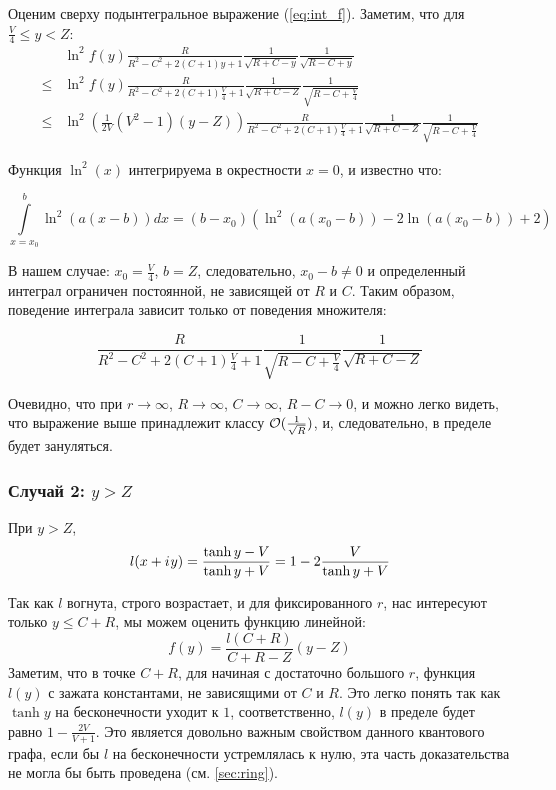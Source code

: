 Оценим сверху подынтегральное выражение (\ref{eq:int_f}). Заметим, что для $\frac{V}{4} \le y < Z$:
\begin{align*}
    & \ln^2 f(y) \frac{R}{R^2 - C^2 + 2 (C + 1) y + 1} \frac{1}{\sqrt{R + C - y}} \frac{1}{\sqrt{R - C + y}} 
\\ \le & \ln^2 f(y) \frac{R}{R^2 - C^2 + 2 (C + 1) \frac{V}{4} + 1} \frac{1}{\sqrt{R + C - Z}} \frac{1}{\sqrt{R - C + \frac{V}{4}}}
\\ \le & \ln^2 \left( \frac{1}{2 V}(V^2 - 1) (y - Z) \right) \frac{R}{R^2 - C^2 + 2 (C + 1) \frac{V}{4} + 1} \frac{1}{\sqrt{R + C - Z}} \frac{1}{\sqrt{R - C + \frac{V}{4}}}
\end{align*}

Функция $\ln^2(x)$ интегрируема в окрестности $x = 0$, и известно что: %

\[
\int\limits_{x=x_0}^b \ln^2(a (x - b)) dx = (b - x_0) (\ln^2(a (x_0 - b)) - 2 \ln(a (x_0 - b)) + 2)
\]

В нашем случае: $x_0 = \frac{V}{4}$, $b = Z$, следовательно, $x_0 - b \ne 0$ и определенный интеграл ограничен постоянной, не зависящей от $R$ и $C$. Таким образом, поведение интеграла зависит только от поведения множителя:

\[
\frac{R}{R^2 - C^2 + 2 (C + 1) \frac{V}{4} + 1} \frac{1}{\sqrt{R - C + \frac{V}{4}}} \frac{1}{\sqrt{R + C - Z}}
\]

Очевидно, что при $r \to \infty$, $R \to \infty$, $C \to \infty$, $R - C \to 0$, и можно легко видеть, что выражение выше принадлежит классу $\mathcal{O}(\frac{1}{\sqrt{R}})$, и, следовательно, в пределе будет зануляться.

\subsubsection{Случай 2: $y > Z$}
При $y > Z$, 
\[
l(x + {i\mkern1mu} y) 
 = \frac{\tanh y - V}{\tanh y + V}
 = 1 - 2 \frac{V}{\tanh y + V}
\]

Так как $l$ вогнута, строго возрастает, и для фиксированного $r$, нас интересуют только $y \le C + R$, мы можем оценить функцию линейной: 
\[
f(y) = \frac{l(C + R)}{C + R - Z} (y - Z)
\]
Заметим, что в точке $C + R$, для начиная с достаточно большого $r$, функция $l(y)$ с зажата константами, не зависящими от $C$ и $R$. Это легко понять так как $\tanh y$ на бесконечности уходит к $1$, соответственно, $l(y)$ в пределе будет равно $1 - \frac{2 V}{V + 1}$. Это является довольно важным свойством данного квантового графа, если бы $l$ на бесконечности устремлялась к нулю, эта часть доказательства не могла бы быть проведена (см. \autoref{sec:ring}).

